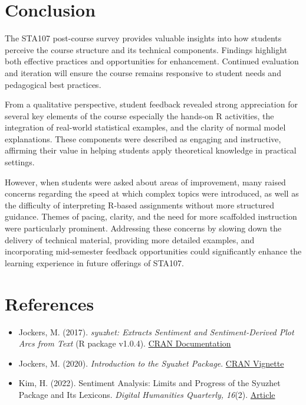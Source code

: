 \documentclass[
  letterpaper,
  DIV=11,
  numbers=noendperiod]{scrartcl}
\begin{document}
\section{Conclusion}\label{conclusion}

The STA107 post-course survey provides valuable insights into how
students perceive the course structure and its technical components.
Findings highlight both effective practices and opportunities for
enhancement. Continued evaluation and iteration will ensure the course
remains responsive to student needs and pedagogical best practices.

From a qualitative perspective, student feedback revealed strong
appreciation for several key elements of the course especially the
hands-on R activities, the integration of real-world statistical
examples, and the clarity of normal model explanations. These components
were described as engaging and instructive, affirming their value in
helping students apply theoretical knowledge in practical settings.

However, when students were asked about areas of improvement, many
raised concerns regarding the speed at which complex topics were
introduced, as well as the difficulty of interpreting R-based
assignments without more structured guidance. Themes of pacing, clarity,
and the need for more scaffolded instruction were particularly
prominent. Addressing these concerns by slowing down the delivery of
technical material, providing more detailed examples, and incorporating
mid-semester feedback opportunities could significantly enhance the
learning experience in future offerings of STA107.

\section{References}\label{references}

\begin{itemize}
\item
  Jockers, M. (2017). \emph{syuzhet: Extracts Sentiment and
  Sentiment-Derived Plot Arcs from Text} (R package v1.0.4).
  \href{https://cran.r-project.org/web/packages/syuzhet/index.html}{CRAN
  Documentation}
\item
  Jockers, M. (2020). \emph{Introduction to the Syuzhet Package}.
  \href{https://cran.r-project.org/web/packages/syuzhet/vignettes/syuzhet-vignette.html}{CRAN
  Vignette}
\item
  Kim, H. (2022). Sentiment Analysis: Limits and Progress of the Syuzhet
  Package and Its Lexicons. \emph{Digital Humanities Quarterly, 16}(2).
  \href{http://www.digitalhumanities.org/dhq/vol/16/2/000601/000601.html}{Article}
\end{itemize}
\end{document}
